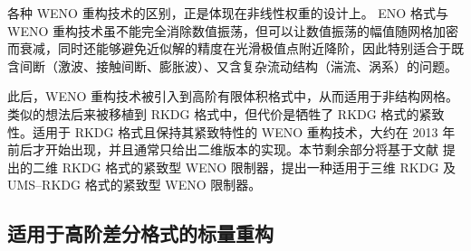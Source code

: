 各种 WENO 重构技术的区别，正是体现在非线性权重的设计上。 ENO 格式与 WENO 重构技术虽不能完全消除数值振荡，但可以让数值振荡的幅值随网格加密而衰减，同时还能够避免近似解的精度在光滑极值点附近降阶，因此特别适合于既含间断（激波、接触间断、膨胀波）、又含复杂流动结构（湍流、涡系）的问题。

此后，WENO 重构技术被引入到高阶有限体积格式中，从而适用于非结构网格。类似的想法后来被移植到 RKDG
格式中，但代价是牺牲了 RKDG 格式的紧致性。适用于 RKDG 格式且保持其紧致特性的
WENO 重构技术，大约在 2013 年前后才开始出现，并且通常只给出二维版本的实现。本节剩余部分将基于文献 \cite{Zhong_2013,Zhu_2013}
提出的二维 RKDG 格式的紧致型 WENO 限制器，提出一种适用于三维 RKDG 及 UMS–RKDG 格式的紧致型 WENO 限制器。

\subsection{适用于高阶差分格式的标量重构}

